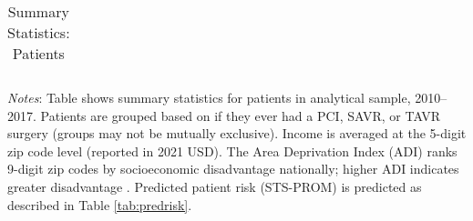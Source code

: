 \begin{table}[H]
\begin{threeparttable}
\begin{tabular}{l|c|ccc}
\bottomrule
\end{tabular}
\begin{tablenotes}
\small
\item \textit{Notes}: Table shows summary statistics for patients in analytical sample, 2010--2017. Patients are grouped based on if they ever had a PCI, SAVR, or TAVR surgery (groups may not be mutually exclusive). Income is averaged at the 5-digit zip code level (reported in 2021 USD). The Area Deprivation Index (ADI) ranks 9-digit zip codes by socioeconomic disadvantage nationally; higher ADI indicates greater disadvantage \citep{kind_making_2018}. Predicted patient risk (STS-PROM) is predicted as described in Table \ref{tab:predrisk}.  
\end{tablenotes}
\caption{\label{tab:sumstats-patients} Summary Statistics: Patients}
\end{threeparttable}
\end{table}
